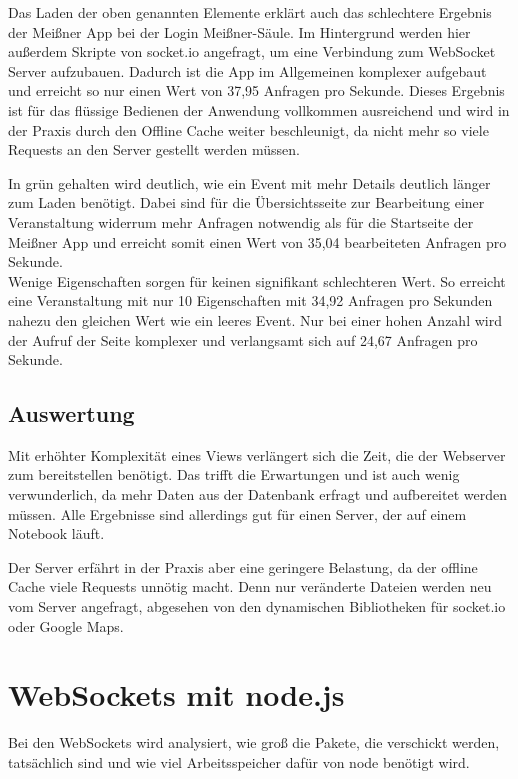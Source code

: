 Das Laden der oben genannten Elemente erklärt auch das schlechtere Ergebnis der Meißner App bei der \glqq Login Meißner\grqq{}-Säule. Im Hintergrund werden hier außerdem Skripte von socket.io angefragt, um eine Verbindung zum WebSocket Server aufzubauen. Dadurch ist die App im Allgemeinen komplexer aufgebaut und erreicht so nur einen Wert von 37,95 Anfragen pro Sekunde. Dieses Ergebnis ist für das flüssige Bedienen der Anwendung vollkommen ausreichend und wird in der Praxis durch den Offline Cache weiter beschleunigt, da nicht mehr so viele Requests an den Server gestellt werden müssen.\par

In grün gehalten wird deutlich, wie ein Event mit mehr Details deutlich länger zum Laden benötigt. Dabei sind für die Übersichtsseite zur Bearbeitung einer Veranstaltung widerrum mehr Anfragen notwendig als für die Startseite der Meißner App und erreicht somit einen Wert von 35,04 bearbeiteten Anfragen pro Sekunde.\\
Wenige Eigenschaften sorgen für keinen signifikant schlechteren Wert. So erreicht eine Veranstaltung mit nur 10 Eigenschaften mit 34,92 Anfragen pro Sekunden nahezu den gleichen Wert wie ein leeres Event. Nur bei einer hohen Anzahl wird der Aufruf der Seite komplexer und verlangsamt sich auf 24,67 Anfragen pro Sekunde.

\subsection{Auswertung}
Mit erhöhter Komplexität eines Views verlängert sich die Zeit, die der Webserver zum bereitstellen benötigt. Das trifft die Erwartungen und ist auch wenig verwunderlich, da mehr Daten aus der Datenbank erfragt und aufbereitet werden müssen. Alle Ergebnisse sind allerdings gut für einen Server, der auf einem Notebook läuft.\par

Der Server erfährt in der Praxis aber eine geringere Belastung, da der offline Cache viele Requests unnötig macht. Denn nur veränderte Dateien werden neu vom Server angefragt, abgesehen von den dynamischen Bibliotheken für socket.io oder Google Maps.


\section{WebSockets mit node.js}
Bei den WebSockets wird analysiert, wie groß die Pakete, die verschickt werden, tatsächlich sind und wie viel Arbeitsspeicher dafür von node benötigt wird.

